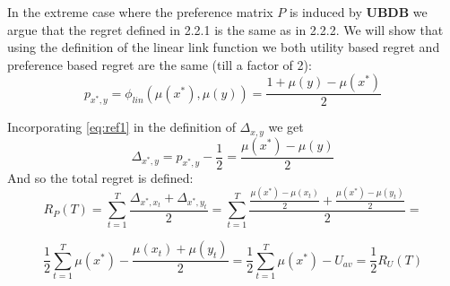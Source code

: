 \documentclass{llncs}
\begin{document}
	In the extreme case where the preference matrix $P$ is induced by \textbf{UBDB} we argue that the regret defined in 2.2.1 is the same as in 2.2.2. 
	We will show that using the definition of the linear link function we both utility based regret and preference based regret are the same (till a factor of 2): 
	\begin{equation}\label{eq:ref1}
		p_{x^*,y} = \phi_{lin}(\mu(x^*),\mu(y)) = \frac{1 +\mu(y)-\mu(x^*)}{2}
	\end{equation}
	
	Incorporating \eqref{eq:ref1} in the definition of $\Delta_{x,y}$ we get
	$$
	\Delta_{x^*,y} = p_{x^*,y} - \frac{1}{2} = \frac{\mu(x^*)-\mu(y)}{2}
	$$
	And so the total regret is defined:
	$$ R_P(T) = \sum_{t=1}^T \frac{\Delta_{x^*,x_t}+\Delta_{x^*,y_t}}{2} =  
\sum_{t=1}^T \frac{\frac{\mu(x^*)-\mu(x_t)}{2}+\frac{\mu(x^*)-\mu(y_t)}{2}}{2} =
$$

$$
\frac{1}{2} \sum_{t=1}^T \mu(x^*) -\frac{
	\mu(x_t)+\mu(y_t)}{2} =
\frac{1}{2} \sum_{t=1}^T \mu(x^*)- U_{av} = \frac{1}{2}R_U(T)$$

\newpage
\end{document}
